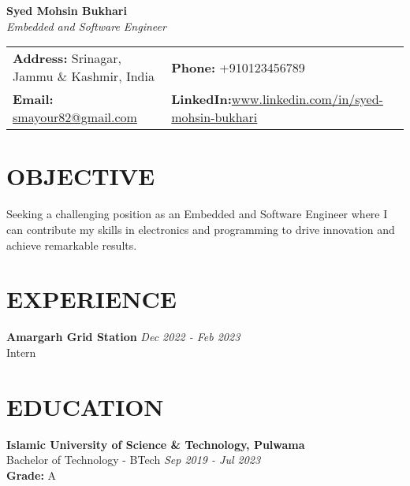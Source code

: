 \documentclass[a4paper,10pt]{article}
\begin{document}
\begin{center}
    \textbf{\Huge Syed Mohsin Bukhari} \\
    \vspace{0.5em}
    \small
    \textit{Embedded and Software Engineer} \\
    \vspace{1em}
    \begin{tabular}{p{10cm}p{6cm}}
        \textbf{Address:} Srinagar, Jammu \& Kashmir, India & \textbf{Phone:} +910123456789 \\
        \textbf{Email:} \url{smayour82@gmail.com} & \textbf{LinkedIn:}\url{www.linkedin.com/in/syed-mohsin-bukhari} \\
    \end{tabular}
\end{center}

\section{OBJECTIVE}
Seeking a challenging position as an Embedded and Software Engineer where I can contribute my skills in electronics and programming to drive innovation and achieve remarkable results.

\section{EXPERIENCE}
\textbf{Amargarh Grid Station} \hfill \textit{Dec 2022 - Feb 2023} \\
Intern

\section{EDUCATION}
\textbf{Islamic University of Science \& Technology, Pulwama} \\
Bachelor of Technology - BTech \hfill \textit{Sep 2019 - Jul 2023} \\
\textbf{Grade:} A
\end{document}
